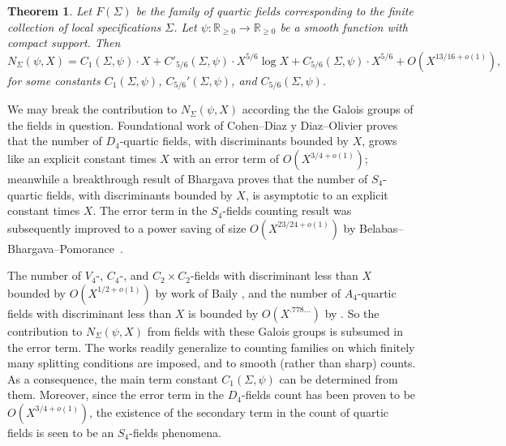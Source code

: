 \documentclass{article}
\def\R{{\mathbb R}}
\newtheorem{Theorem}{Theorem}
\begin{document}
\begin{Theorem}\label{thm:mainallfields}
Let $F(\Sigma)$ be the family of quartic fields corresponding to the finite collection of local specifications $\Sigma$. Let $\psi:\R_{\geq 0}\to\R_{\geq 0}$ be a smooth function with compact support. Then 
\begin{equation*}
N_{\Sigma}(\psi,X)=C_1(\Sigma,\psi)\cdot X+
C'_{5/6}(\Sigma,\psi)\cdot X^{5/6}\log X + C_{5/6}(\Sigma,\psi)\cdot X^{5/6} + O(X^{13/16+o(1)}),
\end{equation*}
for some constants $C_1(\Sigma,\psi)$, $C_{5/6}'(\Sigma,\psi)$, and $C_{5/6}(\Sigma,\psi)$.
\end{Theorem}
We may break the contribution to $N_\Sigma(\psi,X)$ according the the Galois groups of the fields in question. Foundational work of Cohen--Diaz y Diaz--Olivier \cite[Corollary 6.1]{Cohen_Diaz_Olivier} proves that the number of $D_4$-quartic fields, with discriminants bounded by $X$, grows like an explicit constant times $X$ with an error term of $O(X^{3/4+o(1)})$; meanwhile a breakthrough result of Bhargava \cite[Theorem 1]{dodqf} proves that the number of $S_4$-quartic fields, with discriminants bounded by $X$, is asymptotic to an explicit constant times $X$. The error term in the $S_4$-fields counting result was subsequently improved to 
a power saving of size $O(X^{23/24+o(1)})$ by Belabas--Bhargava--Pomorance~\cite{BBPEE}. 

The number of $V_4$-, $C_4$-, and $C_2\times C_2$-fields with discriminant less than $X$ bounded by $O(X^{1/2+o(1)})$ by work of Baily \cite{Baily}, and the number of $A_4$-quartic fields with discriminant less than $X$ is bounded by $O(X^{.778...})$ by \cite[Theorem 1.4]{BSTTTZ}. So the contribution to $N_\Sigma(\psi,X)$ from fields with these Galois groups is subsumed in the error term. The works \cite{Cohen_Diaz_Olivier,dodqf} readily generalize to counting families on which finitely many splitting conditions are imposed, and to smooth (rather than sharp) counts. As a consequence, the main term constant $C_1(\Sigma,\psi)$ can be determined from them. Moreover, since the error term in the $D_4$-fields count has been proven to be $O(X^{3/4+o(1)})$, the existence of the secondary term in the count of quartic fields is seen to be an $S_4$-fields phenomena. 
\end{document}
